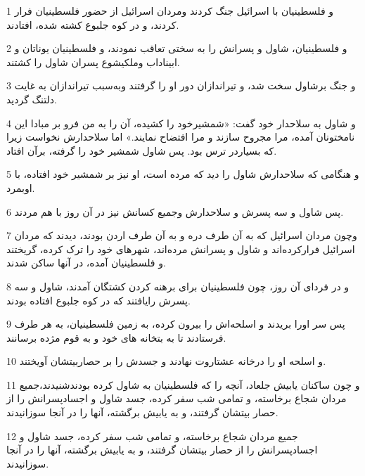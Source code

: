 \par 1 و فلسطینیان با اسرائیل جنگ کردند ومردان اسرائیل از حضور فلسطینیان فرار کردند، و در کوه جلبوع کشته شده، افتادند.
\par 2 و فلسطینیان، شاول و پسرانش را به سختی تعاقب نمودند، و فلسطینیان یوناتان و ابیناداب وملکیشوع پسران شاول را کشتند.
\par 3 و جنگ برشاول سخت شد، و تیراندازان دور او را گرفتند وبه‌سبب تیراندازان به غایت دلتنگ گردید.
\par 4 و شاول به سلاحدار خود گفت: «شمشیرخود را کشیده، آن را به من فرو بر مبادا این نامختونان آمده، مرا مجروح سازند و مرا افتضاح نمایند.» اما سلاحدارش نخواست زیرا که بسیاردر ترس بود. پس شاول شمشیر خود را گرفته، برآن افتاد.
\par 5 و هنگامی که سلاحدارش شاول را دید که مرده است، او نیز بر شمشیر خود افتاده، با اوبمرد.
\par 6 پس شاول و سه پسرش و سلاحدارش وجمیع کسانش نیز در آن روز با هم مردند.
\par 7 وچون مردان اسرائیل که به آن طرف دره و به آن طرف اردن بودند، دیدند که مردان اسرائیل فرارکرده‌اند و شاول و پسرانش مرده‌اند، شهرهای خود را ترک کرده، گریختند و فلسطینیان آمده، در آنها ساکن شدند.
\par 8 و در فردای آن روز، چون فلسطینیان برای برهنه کردن کشتگان آمدند، شاول و سه پسرش رایافتند که در کوه جلبوع افتاده بودند.
\par 9 پس سر اورا بریدند و اسلحه‌اش را بیرون کرده، به زمین فلسطینیان، به هر طرف فرستادند تا به بتخانه های خود و به قوم مژده برسانند. 
\par 10 و اسلحه او را درخانه عشتاروت نهادند و جسدش را بر حصاربیتشان آویختند.
\par 11 و چون ساکنان یابیش جلعاد، آنچه را که فلسطینیان به شاول کرده بودندشنیدند،جمیع مردان شجاع برخاسته، و تمامی شب سفر کرده، جسد شاول و اجسادپسرانش را از حصار بیتشان گرفتند، و به یابیش برگشته، آنها را در آنجا سوزانیدند.
\par 12 جمیع مردان شجاع برخاسته، و تمامی شب سفر کرده، جسد شاول و اجسادپسرانش را از حصار بیتشان گرفتند، و به یابیش برگشته، آنها را در آنجا سوزانیدند.



